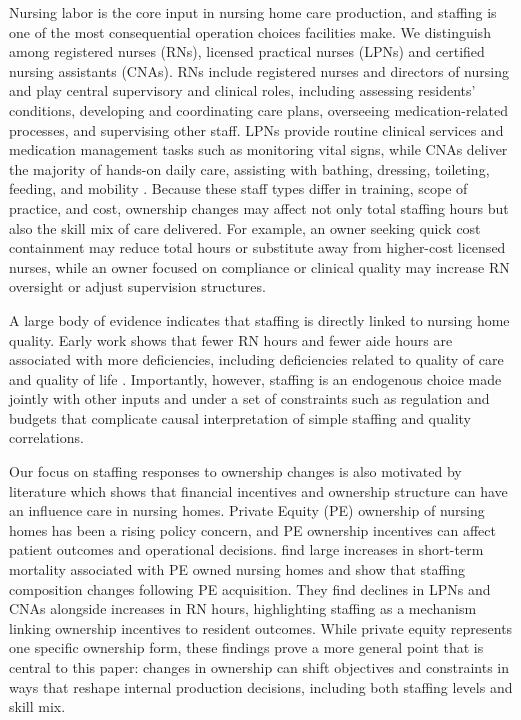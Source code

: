 \documentclass[preprint,authoryear]{elsarticle}
\begin{document}
Nursing labor is the core input in nursing home care production, and staffing is one of the most consequential operation choices facilities make. We distinguish among registered nurses (RNs), licensed practical nurses (LPNs) and certified nursing assistants (CNAs). RNs include registered nurses and directors of nursing and play central supervisory and clinical roles, including assessing residents’ conditions, developing and coordinating care plans, overseeing medication-related processes, and supervising other staff. LPNs provide routine clinical services and medication management tasks such as monitoring vital signs, while CNAs deliver the majority of hands-on daily care, assisting with bathing, dressing, toileting, feeding, and mobility \citep{lin_2014}. Because these staff types differ in training, scope of practice, and cost, ownership changes may affect not only total staffing hours but also the skill mix of care delivered. For example, an owner seeking quick cost containment may reduce total hours or substitute away from higher-cost licensed nurses, while an owner focused on compliance or clinical quality may increase RN oversight or adjust supervision structures.

A large body of evidence indicates that staffing is directly linked to nursing home quality. Early work shows that fewer RN hours and fewer aide hours are associated with more deficiencies, including deficiencies related to quality of care and quality of life \citep{harrington_et_al_2000}. Importantly, however, staffing is an endogenous choice made jointly with other inputs and under a set of constraints such as regulation and budgets that complicate causal interpretation of simple staffing and quality correlations. 

Our focus on staffing responses to ownership changes is also motivated by literature which shows that financial incentives and ownership structure can have an influence care in nursing homes. Private Equity (PE) ownership of nursing homes has been a rising policy concern, and PE ownership incentives can affect patient outcomes and operational decisions. \cite{gupta_et_al_2021} find large increases in short-term mortality associated with PE owned nursing homes and show that staffing composition changes following PE acquisition. They find declines in LPNs and CNAs alongside increases in RN hours, highlighting staffing as a mechanism linking ownership incentives to resident outcomes. While private equity represents one specific ownership form, these findings prove a more general point that is central to this paper: changes in ownership can shift objectives and constraints in ways that reshape internal production decisions, including both staffing levels and skill mix.
\end{document}

